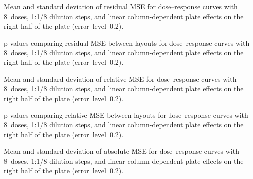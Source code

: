 \begin{table}[p]
    \centering
    \small
    
    \caption{Mean and standard deviation of residual MSE for dose--response curves with 8~doses, 1:1/8 dilution steps, and linear column-dependent plate effects on the right half of the plate (error~level~0.2).}
    \label{tab:dr-residuals-mean-std-8doses-dil8-half-columns-neg-controls-0.2}
\end{table}

\begin{table}[p]
    \centering
    \small
    
    \caption{p-values comparing residual MSE between layouts for dose--response curves with 8~doses, 1:1/8 dilution steps, and linear column-dependent plate effects on the right half of the plate (error~level~0.2).}
    \label{tab:dr-residuals-pvalues-8doses-dil8-half-columns-neg-controls-0.2}
\end{table}

\begin{table}[p]
    \centering
    \small
    
    \caption{Mean and standard deviation of relative \ECIC{} MSE for dose--response curves with 8~doses, 1:1/8 dilution steps, and linear column-dependent plate effects on the right half of the plate (error~level~0.2).}
    \label{tab:dr-relic50-mean-std-8doses-dil8-half-columns-neg-controls-0.2}
\end{table}

\clearpage
\begin{table}[p]
    \centering
    \small
    
    \caption{p-values comparing relative \ECIC{} MSE between layouts for dose--response curves with 8~doses, 1:1/8 dilution steps, and linear column-dependent plate effects on the right half of the plate (error~level~0.2).}
    \label{tab:dr-relic50-pvalues-8doses-dil8-half-columns-neg-controls-0.2}
\end{table}

\begin{table}[p]
    \centering
    \small
    
    \caption{Mean and standard deviation of absolute \ECIC{} MSE for dose--response curves with 8~doses, 1:1/8 dilution steps, and linear column-dependent plate effects on the right half of the plate (error~level~0.2).}
    \label{tab:dr-absic50-mean-std-8doses-dil8-half-columns-neg-controls-0.2}
\end{table}

